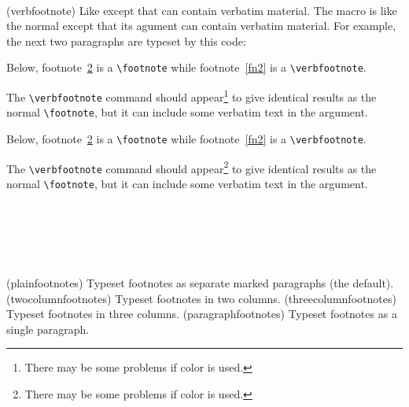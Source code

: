  \begin{syntax}
 \cmd{\verbfootnote} \\
 \end{syntax}
\glossary(verbfootnote)%
  {}%
  {Like  except that  can contain verbatim material.}
 The macro \cmd{\verbfootnote} is like the normal \cmd{\footnote}
except that its  agument 
can contain verbatim material.
For example, the next two paragraphs are typeset by this code:
 \begin{lcode}
    Below, footnote~\ref{fn1} is a \verb?\footnote? while
footnote~\ref{fn2} is a \verb?\verbfootnote?.

    The \verb?\verbfootnote? command should 
appear\footnote{There may be some problems if color is
		 used.\label{fn1}}
to give identical results as the normal \verb?\footnote?, 
but it can include some verbatim 
text
in the  argument.
\end{lcode}

     Below, footnote~\ref{fn1} is a \verb?\footnote? while
 footnote~\ref{fn2} is a \verb?\verbfootnote?.

     The \verb?\verbfootnote? command should 
 appear\footnote{There may be some problems if color is
		 used.\label{fn1}}
 to give identical results as the normal \verb?\footnote?, but it
 can include some verbatim 
 text
 in the  argument.



\begin{syntax}
\cmd{\plainfootnotes} \\
\cmd{\twocolumnfootnotes} \\
\cmd{\threecolumnfootnotes} \\
\cmd{\paragraphfootnotes} \\
\end{syntax}
\glossary(plainfootnotes)%
  {}%
  {Typeset footnotes as separate marked paragraphs (the default).}
\glossary(twocolumnfootnotes)%
  {}%
  {Typeset footnotes in two columns.}
\glossary(threecolumnfootnotes)%
  {}%
  {Typeset footnotes in three columns.}
\glossary(paragraphfootnotes)%
  {}%
  {Typeset footnotes as a single paragraph.}

